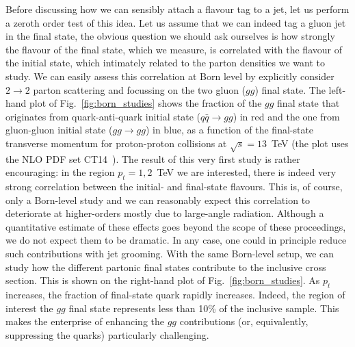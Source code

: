 Before discussing how we can sensibly attach a flavour tag to a jet, let us perform a zeroth order test of this idea. Let us assume that we can indeed tag a gluon jet in the final state, the obvious question we should ask ourselves is how strongly the flavour of the final state, which we measure, is correlated with the flavour of the initial state, which intimately related to the parton densities we want to study. 
%
We can easily assess this correlation at Born level by explicitly consider $2 \to 2$ parton scattering and focussing on the two gluon ($gg$) final state. The left-hand plot of Fig.~\ref{fig:born_studies} shows the fraction of the $gg$ final state that originates from quark-anti-quark initial state ($q \bar q \to gg$) in red and the one from gluon-gluon initial state ($gg \to gg$)  in blue, as a function of the final-state transverse momentum for proton-proton collisions at $\sqrt{s}=13$~TeV (the plot uses the NLO PDF set CT14~\cite{Dulat:2015mca}). 
%
The result of this very first study is rather encouraging: in the region $p_t=1,2$~TeV we are interested, there is indeed very strong correlation between the initial- and final-state flavours. This is, of course, only a Born-level study and we can reasonably expect this correlation to deteriorate at higher-orders mostly due to large-angle radiation. 
%
Although a quantitative estimate of these effects goes beyond the scope of these proceedings, we do not expect them to be dramatic. In any case, one could in principle reduce such contributions with jet grooming. 
%
With the same Born-level setup, we can study how the different partonic final states contribute to the inclusive cross section. This is shown on the right-hand plot of Fig.~\ref{fig:born_studies}. As $p_t$ increases, the fraction of final-state quark rapidly increases. Indeed, the region of interest the $gg$ final state represents less than 10\% of the inclusive sample. This makes the enterprise of enhancing the $gg$ contributions (or, equivalently, suppressing the quarks) particularly challenging. 



